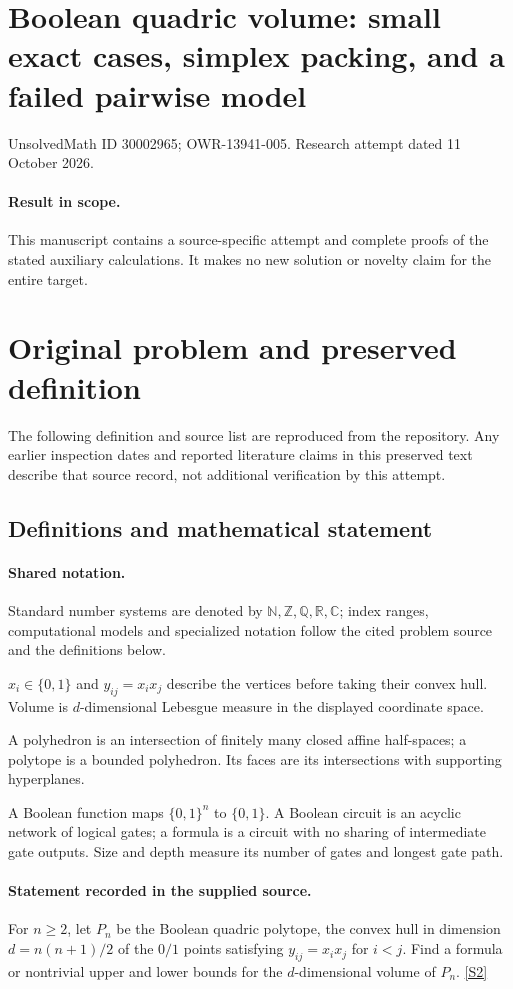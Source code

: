 \documentclass[11pt]{article}
\begin{document}
\section*{Boolean quadric volume: small exact cases, simplex packing, and a failed pairwise model}
\noindent UnsolvedMath ID 30002965; OWR-13941-005. Research attempt dated 11 October 2026.
\paragraph{Result in scope.}This manuscript contains a source-specific attempt and complete proofs of the stated auxiliary calculations. It makes no new solution or novelty claim for the entire target.
\section{Original problem and preserved definition}
The following definition and source list are reproduced from the repository. Any earlier inspection dates and reported literature claims in this preserved text describe that source record, not additional verification by this attempt.
\subsection{Definitions and mathematical statement}

\paragraph{Shared notation.}Standard number systems are denoted by $\mathbb N,\mathbb Z,\mathbb Q,\mathbb R,\mathbb C$; index ranges, computational models and specialized notation follow the cited problem source and the definitions below.


$x_i\in\{0,1\}$ and $y_{ij}=x_ix_j$ describe the vertices before taking their convex hull. Volume is $d$-dimensional Lebesgue measure in the displayed coordinate space.

A polyhedron is an intersection of finitely many closed affine half-spaces; a polytope is a bounded polyhedron. Its faces are its intersections with supporting hyperplanes.

A Boolean function maps $\{0,1\}^n$ to $\{0,1\}$. A Boolean circuit is an acyclic network of logical gates; a formula is a circuit with no sharing of intermediate gate outputs. Size and depth measure its number of gates and longest gate path.
\paragraph{Statement recorded in the supplied source.}
For $n\geq2$, let $P_n$ be the Boolean quadric polytope, the convex hull in dimension $d=n(n+1)/2$ of the $0/1$ points satisfying $y_{ij}=x_ix_j$ for $i<j$. Find a formula or nontrivial upper and lower bounds for the $d$-dimensional volume of $P_n$. \href{https://doi.org/10.4171/owr/2015/46}{[S2]}
\end{document}
